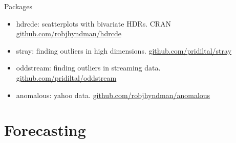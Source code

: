 \documentclass[14pt,ignorenonframetext,]{beamer}
\begin{document}
\begin{frame}{Packages}
\protect\hypertarget{packages}{}

\fontsize{14.5}{18}\sf

\begin{itemize}
\item
  \alert{hdrcde}: scatterplots with bivariate HDRs. \newline CRAN
  \textbar{} \url{github.com/robjhyndman/hdrcde}\vspace*{0.4cm}
\item
  \alert{stray}: finding outliers in high dimensions.
  \newline\url{github.com/pridiltal/stray}\vspace*{0.4cm}
\item
  \alert{oddstream}: finding outliers in streaming data.
  \newline\url{github.com/pridiltal/oddstream}\vspace*{0.4cm}
\item
  \alert{anomalous}: yahoo data.
  \newline\url{github.com/robjhyndman/anomalous}
\end{itemize}

\end{frame}

\hypertarget{forecasting}{%
\section{Forecasting}\label{forecasting}}
\end{document}
